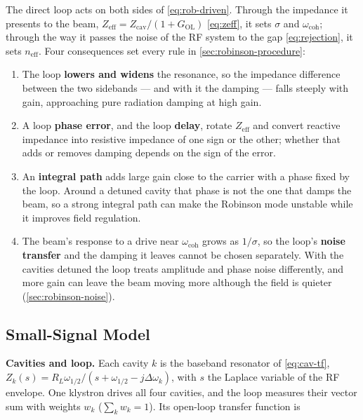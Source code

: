 The direct loop acts on both sides of \cref{eq:rob-driven}. Through the impedance it presents to the beam, \(Z_\text{eff} = Z_\text{cav}/(1 + G_\text{OL})\) \eqref{eq:zeff}, it sets \(\sigma\) and \(\omega_\text{coh}\); through the way it passes the noise of the RF system to the gap \eqref{eq:rejection}, it sets \(n_\text{eff}\). Four consequences set every rule in \cref{sec:robinson-procedure}:

\begin{enumerate}
\item The loop \textbf{lowers and widens} the resonance, so the impedance difference between the two sidebands --- and with it the damping --- falls steeply with gain, approaching pure radiation damping at high gain.
\item A loop \textbf{phase error}, and the loop \textbf{delay}, rotate \(Z_\text{eff}\) and convert reactive impedance into resistive impedance of one sign or the other; whether that adds or removes damping depends on the sign of the error.
\item An \textbf{integral path} adds large gain close to the carrier with a phase fixed by the loop. Around a detuned cavity that phase is not the one that damps the beam, so a strong integral path can make the Robinson mode unstable while it improves field regulation.
\item The beam's response to a drive near \(\omega_\text{coh}\) grows as \(1/\sigma\), so the loop's \textbf{noise transfer} and the damping it leaves cannot be chosen separately. With the cavities detuned the loop treats amplitude and phase noise differently, and more gain can leave the beam moving more although the field is quieter (\cref{sec:robinson-noise}).
\end{enumerate}

\subsection{Small-Signal Model}\label{sec:robinson-model}

\textbf{Cavities and loop.} Each cavity \(k\) is the baseband resonator of \cref{eq:cav-tf}, \(Z_k(s) = R_L\omega_{1/2}/(s + \omega_{1/2} - j\Delta\omega_k)\), with \(s\) the Laplace variable of the RF envelope. One klystron drives all four cavities, and the loop measures their vector sum with weights \(w_k\) (\(\sum_k w_k = 1\)). Its open-loop transfer function is

